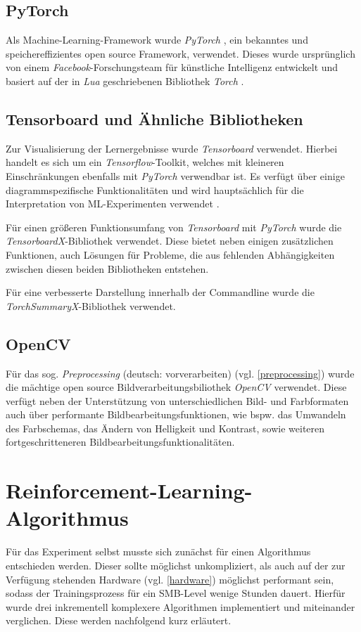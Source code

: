 \documentclass[sigconf,nonacm]{acmart}
\begin{document}
\subsection{PyTorch}
Als Machine-Learning-Framework wurde \textit{PyTorch} \cite{pytorch}, ein bekanntes und speichereffizientes open source Framework, verwendet. Dieses wurde ursprünglich von einem \textit{Facebook}-Forschungsteam für künstliche Intelligenz entwickelt und basiert auf der in \textit{Lua} geschriebenen Bibliothek \textit{Torch} \cite{torch}. \cite{pytorchtext}

\subsection{Tensorboard und Ähnliche Bibliotheken}
Zur Visualisierung der Lernergebnisse wurde \textit{Tensorboard} \cite{tensorboard} verwendet. Hierbei handelt es sich um ein \textit{Tensorflow}-Toolkit, welches mit kleineren Einschränkungen ebenfalls mit \textit{PyTorch} verwendbar ist. Es verfügt über einige diagrammspezifische Funktionalitäten und wird hauptsächlich für die Interpretation von ML-Experimenten verwendet \cite{tensorflowwhy}.

Für einen größeren Funktionsumfang von \textit{Tensorboard} mit \textit{PyTorch} wurde die \textit{TensorboardX}-Bibliothek verwendet. Diese bietet neben einigen zusätzlichen Funktionen, auch Lösungen für Probleme, die aus fehlenden Abhängigkeiten zwischen diesen beiden Bibliotheken entstehen.

Für eine verbesserte Darstellung innerhalb der Commandline wurde die \textit{TorchSummaryX}-Bibliothek verwendet. \cite{tensorX}

\subsection{OpenCV}
Für das sog. \textit{Preprocessing} (deutsch: vorverarbeiten) (vgl. \ref{preprocessing}) wurde die mächtige open source Bildverarbeitungsbiliothek \textit{OpenCV} verwendet. Diese verfügt neben der Unterstützung von unterschiedlichen Bild- und Farbformaten auch über performante Bildbearbeitungsfunktionen, wie bspw. das Umwandeln des Farbschemas, das Ändern von Helligkeit und Kontrast, sowie weiteren fortgeschritteneren Bildbearbeitungsfunktionalitäten. \cite{opencv}

\section{Reinforcement-Learning-Algorithmus}
Für das Experiment selbst musste sich zunächst für einen Algorithmus entschieden werden. Dieser sollte möglichst unkompliziert, als auch auf der zur Verfügung stehenden Hardware (vgl. \ref{hardware}) möglichst performant sein, sodass der Trainingsprozess für ein SMB-Level wenige Stunden dauert. Hierfür wurde drei inkrementell komplexere Algorithmen implementiert und miteinander verglichen. Diese werden nachfolgend kurz erläutert.
\end{document}
